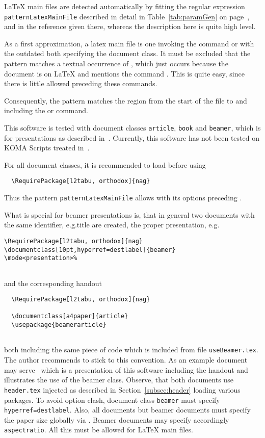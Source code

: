 \LaTeX{} main files are detected automatically 
by fitting the regular expression \texttt{patternLatexMainFile} 
described in detail in Table~\ref{tab:paramGen} on page~\pageref{tab:paramGen}, 
and in the reference given there, 
whereas the description here is quite high level. 

As a first approximation, a latex main file is one invoking 
the command  
or with the outdated  both specifying the document class. 
It must be excluded that the pattern matches a textual occurrence of , 
which just occurs because the document is on \LaTeX{} 
and mentions the command . 
This is quite easy, since there is little allowed preceding these commands. 

Consequently, the pattern matches the region from the start of the file 
to and including the  or  command. 

This software is tested with document classes \texttt{article}, \texttt{book} 
and \texttt{beamer}, which is for presentations as described in~\cite{Beamer}. 
Currently, this software has not been tested on KOMA Scripts treated in~\cite{KomaAnl}. 

For all document classes, it is recommended to load  
before  using 
%
\begin{Verbatim}
  \RequirePackage[l2tabu, orthodox]{nag}
\end{Verbatim}
%
Thus the pattern \texttt{patternLatexMainFile} 
allows  with its options preceding . 

What is special for beamer presentations is, 
that in general two documents with the same identifier, e.g.\@ title are created, 
the proper presentation, e.g.\@ 
%
\begin{Verbatim}
\RequirePackage[l2tabu, orthodox]{nag}
\documentclass[10pt,hyperref=destlabel]{beamer}
\mode<presentation>%


\end{Verbatim}
%
and the corresponding handout 
%
\begin{Verbatim}
  \RequirePackage[l2tabu, orthodox]{nag}

  \documentclass[a4paper]{article}
  \usepackage{beamerarticle}
  
\end{Verbatim}
%
both including the same piece of code which is included from file \texttt{useBeamer.tex}. 
The author recommends to stick to this convention. 
As an example document may serve~\cite{PresBeamer} 
which is a presentation of this software including the handout 
and illustrates the use of the beamer class. 
Observe, that both documents use \texttt{header.tex} injected 
as described in Section~\ref{subsec:header} loading various packages. 
To avoid option clash, document class \texttt{beamer} must specify \texttt{hyperref=destlabel}. 
Also, all documents but beamer documents 
must specify the paper size globally via . 
Beamer documents may specify accordingly \texttt{aspectratio}. 
All this must be allowed for \LaTeX{} main files. 

